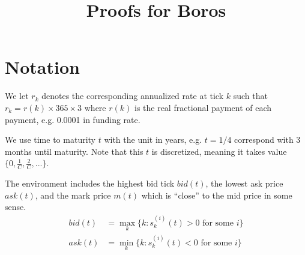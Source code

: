 \documentclass[notitlepage,reqno,11pt]{amsart}
\numberwithin{equation}{section}
\begin{document}
\newcommand{\ttl}{\Large Proofs for Boros}



\title[]{\ttl}



\maketitle

\section{Notation}

We let $r_k$ denotes the corresponding annualized rate at tick $k$ such that $r_k = r(k)\times 365\times 3$ where $r(k)$ is the real fractional payment of each payment, e.g. 0.0001 in funding rate.

We use time to maturity $t$ with the unit in years, e.g. $t=1/4$ correspond with 3 months until maturity. Note that this $t$ is discretized, meaning it takes value $\{0, \frac{1}{C}, \frac{2}{C}, ...\}$.

The environment includes the highest bid tick $bid(t)$, the lowest ask price $ask(t)$, and the mark price $m(t)$ which is “close” to the mid price in some sense. 
\begin{align*}
    bid(t) &= \max_k\{k:s^{(i)}_k(t)>0 \text{ for some } i\}\\
    ask(t) &= \min_k\{k:s^{(i)}_k(t)<0 \text{ for some } i\}\\
\end{align*}

\end{document}
